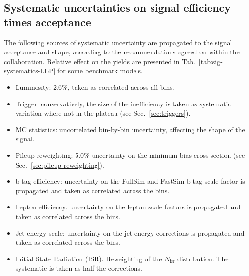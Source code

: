 \clearpage
\subsection{Systematic uncertainties on signal efficiency times acceptance}
\label{sec:sig-syst-LLP}

The following sources of systematic uncertainty are propagated to the signal
acceptance and shape, according to the recommendations agreed on within the
collaboration. Relative effect on the yields are presented in
Tab.~\ref{tab:sig-systematics-LLP} for some benchmark models.

\begin{itemize}
    \item Luminosity: 2.6\%, taken as correlated across all bins.
    \item Trigger: conservatively, the size of the inefficiency is taken as
        systematic variation where not in the plateau (see Sec.~\ref{sec:triggers}).
    \item MC statistics:  uncorrelated bin-by-bin uncertainty, affecting the
        shape of the signal.
    \item Pileup reweighting: 5.0\% uncertainty on the minimum bias cross section
        (see Sec.~\ref{sec:pileup-reweighting}).
    \item b-tag efficiency: uncertainty on the FullSim and FastSim b-tag scale
        factor is propagated and taken as correlated across the bins.
    \item Lepton efficiency: uncertainty on the lepton scale factors is
        propagated and taken as correlated across the bins.
    \item Jet energy scale: uncertainty on the jet energy corrections is
        propagated and taken as correlated across the bins.
    \item Initial State Radiation (ISR): Reweighting of the $N_{\text{isr}}$
        distribution. The systematic is taken as half the corrections.
\end{itemize}

